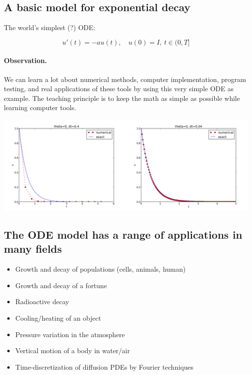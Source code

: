 \documentclass[%
oneside,                 %
final,                   %
10pt]{article}
\begin{document}
\noindent



\subsection*{A basic model for exponential decay}
\label{decay:model}

 

The world's simplest (?) ODE:

\begin{equation*}
u'(t) = -au(t),\quad u(0)=I,\ t\in (0,T]
\end{equation*}


\paragraph{Observation.}
We can learn a lot about numerical methods, computer implementation,
program testing, and real applications of these tools by using
this very simple ODE as example. The teaching principle is to keep the math as
simple as possible while learning computer tools.





\centerline{\includegraphics[width=0.7\linewidth]{fig-alg/FE1.png}}



\subsection*{The ODE model has a range of applications in many fields}

\begin{itemize}
 \item Growth and decay of populations (cells, animals, human)

 \item Growth and decay of a fortune

 \item Radioactive decay

 \item Cooling/heating of an object

 \item Pressure variation in the atmosphere

 \item Vertical motion of a body in water/air

 \item Time-discretization of diffusion PDEs by Fourier techniques
\end{itemize}
\end{document}
